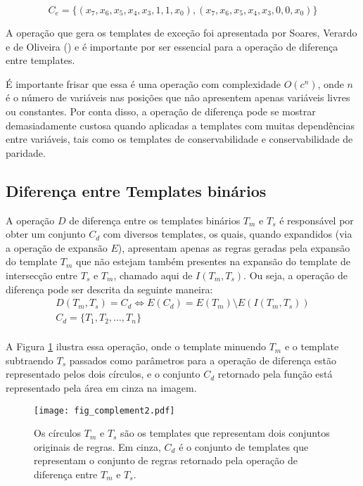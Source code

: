 \begin{equation}
C_e = \{(x_7, x_6, x_5, x_4, x_3, 1, 1, x_0),(x_7, x_6, x_5, x_4, x_3, 0, 0, x_0)\}
\label{eq:exceptionsTemplates2}
\end{equation}

A operação que gera os templates de exceção foi apresentada por Soares, Verardo e
de Oliveira (\citeyear{soares2016difference}) e é importante por ser essencial para a operação de diferença entre templates. 

É importante frisar que essa é uma operação com complexidade $O(c^n)$, onde $n$ é o número de variáveis nas posições que não apresentem apenas variáveis livres ou constantes. Por conta disso, a operação de diferença pode se mostrar demasiadamente custosa quando aplicadas a templates com muitas dependências entre variáveis, tais como os templates de conservabilidade e conservabilidade de paridade.

\subsection{Diferença entre Templates binários}
A operação $D$ de diferença entre os templates binários $T_m$ e $T_s$ é responsável por obter um conjunto $C_{d}$ com diversos templates, os quais, quando expandidos (via a operação de expansão $E$), apresentam apenas as regras geradas pela expansão do template $T_m$ que não estejam também presentes na expansão do template de intersecção entre $T_s$ e $T_m$, chamado aqui de $I(T_m, T_s)$. Ou seja, a operação de diferença pode ser descrita da seguinte maneira:
\begin{equation}
\begin{split}
D(T_m,T_s)= C_{d} \Leftrightarrow E(C_{d}) = E(T_m) \setminus E(I(T_m, T_s)) \\
C_{d} = \{T_1,T_2,\dots, T_n\}\\
\end{split}
\end{equation}

A Figura \ref{fig:complement} ilustra essa operação, onde o template minuendo $T_m$ e o template subtraendo $T_s$ passados como parâmetros para a operação de diferença estão representado pelos dois círculos, e o conjunto $C_{d}$ retornado pela função está representado pela área em cinza na imagem.
\begin{figure}[h!]
  \centering
  \texttt{[image: fig\_complement2.pdf]}
  \caption{Os círculos $T_m$ e $T_s$ são os templates que representam dois conjuntos originais de regras. Em cinza, $C_{d}$ é o conjunto de templates que representam o conjunto de regras retornado pela operação de diferença entre $T_m$ e $T_s$.}
  \label{fig:complement}
\end{figure}    

